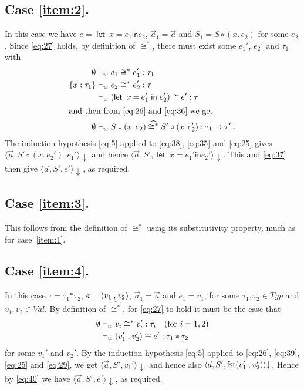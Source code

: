 \documentclass{LMCS}
\theoremstyle{plain}
\theoremstyle{definition}
\newcommand{\comp}{\circ}
\newcommand{\config}[3]{\langle#1, #2, #3\rangle}
\newcommand{\CR}[1]{\mathrel{\widehat{#1}}}
\newcommand{\ent}{\vdash}
\newcommand{\EQ}{\mathbin{\kw{=}}}
\renewcommand{\exp}[1][e]{#1}
\newcommand{\FST}{\kw{fst}}
\newcommand{\FUNTY}{\mathbin{\rightarrow}}
\newcommand{\IN}{\mathrel{\kw{in}}}
\newcommand{\LET}{\mathop{\kw{let}}}
\newcommand{\kw}[1]{\mathsf{#1}}
\newcommand{\ofty}{:}
\newcommand{\opeq}{\cong}
\newcommand{\PRODTY}{\mathbin{\kw{*}}}
\newcommand{\s}[1][a]{\vec{#1}}
\newcommand{\stk}[1][S]{#1}
\newcommand{\terminates}[1][]{{\downarrow_{#1}}}
\newcommand{\ty}{\tau}
\newcommand{\Ty}{\mathit{Typ}}
\newcommand{\val}[1][v]{#1}
\newcommand{\Val}{\mathit{Val}}
\newcommand{\vid}[1][x]{#1}
\newcommand{\w}[1][w]{#1}
\begin{document}
  \subsection*{Case \ref{item:2}.} In this case we have $\exp = \LET\
  {\vid\EQ \exp_1} \IN \exp_2$, $\s_1=\s$ and
  $\stk_1=\stk\comp(\vid.\,\exp_2)$ for some $\exp_2$. Since
  \eqref{eq:27} holds, by definition of $\opeq^*$, there must exist
  some $\exp_1'$, $\exp_2'$ and $\ty_1$ with
  \begin{align}
    \emptyset &\ent_{\w} \exp_1 \opeq^*
    \exp_1'\ofty\ty_1\label{eq:35}\\
    \{\vid\ofty\ty_1\} &\ent_{\w} \exp_2 \opeq^*
    \exp_2'\ofty \ty\label{eq:36}\\
    {} &\ent_{\w} (\LET\ {\vid\EQ \exp_1'} \IN \exp_2')\opeq
    \exp'\ofty\ty\label{eq:37}\\
    \intertext{and then from \eqref{eq:26} and \eqref{eq:36} we get}
    \emptyset &\ent_{\w} \stk\comp(\vid.\,\exp_2) \CR{\opeq^*}
    \stk'\comp(\vid.\,\exp_2') \ofty \ty_1\FUNTY\ty'\;.\label{eq:38}
  \end{align}
  The induction hypothesis \eqref{eq:5} applied to \eqref{eq:38},
  \eqref{eq:35} and \eqref{eq:25} gives
  $\config{\s}{\stk'\comp(\vid.\,\exp_2')}{\exp_1'}\terminates$ and
  hence $\config{\s}{\stk'}{\LET\ {\vid\EQ \exp_1'} \IN
  \exp_2'}\terminates$. This and \eqref{eq:37} then give
  $\config{\s}{\stk'}{\exp'}\terminates$, as required.

  \subsection*{Case \ref{item:3}.}  This follows from the definition of
  $\opeq^*$ using its substitutivity property, much as for
  case~\ref{item:1}.

  \subsection*{Case \ref{item:4}.} In this case $\ty=\ty_1\PRODTY\ty_2$,
  $\exp=\PAIR{\val_1}{\val_2}$, $\s_1=\s$ and $\exp_1=\val_1$, for
  some $\ty_1,\ty_2\in\Ty$ and $\val_1,\val_2\in\Val$. By definition
  of $\CR{\opeq^*}$, for \eqref{eq:27} to hold it must be the case
  that
  \begin{align}
    \emptyset &\ent_{\w} \val_i\opeq^* 
    \val_i'\ofty\ty_i\quad\text{(for $i=1,2$)} \label{eq:39}\\
    {} &\ent_{\w} \PAIR{\val_1'}{\val_2'}\opeq
    \exp'\ofty\ty_1\PRODTY\ty_2 \label{eq:40}
  \end{align}
  for some $\val_1'$ and $\val_2'$.  By the induction hypothesis
  \eqref{eq:5} applied to \eqref{eq:26}, \eqref{eq:39}, \eqref{eq:25}
  and \eqref{eq:29}, we get $\config{\s}{\stk'}{\val_1'}\terminates$
  and hence also
  $\config{\s}{\stk'}{\FST\PAIR{v_1'}{v_2'}}\terminates$. Hence by
  \eqref{eq:40} we have $\config{\s}{\stk'}{\exp'}\terminates$, as
  required.
\end{document}
